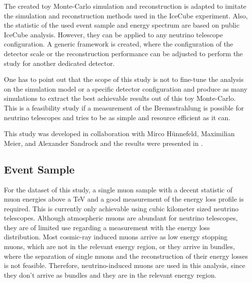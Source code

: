 The created toy Monte-Carlo simulation and reconstruction is adapted to imitate the simulation and reconstruction methods used in the IceCube experiment.
Also, the statistic of the used event sample and energy spectrum are based on public IceCube analysis.
However, they can be applied to any neutrino telescope configuration.
A generic framework is created, where the configuration of the detector scale or the reconstruction performance can be adjusted to perform the study for another dedicated detector.

One has to point out that the scope of this study is not to fine-tune the analysis on the simulation model or a specific detector configuration and produce as many simulations to extract the best achievable results out of this toy Monte-Carlo.
This is a feasibility study if a measurement of the Bremsstrahlung is possible for neutrino telescopes and tries to be as simple and resource efficient as it can.

This study was developed in collaboration with Mirco Hünnefeld, Maximilian Meier, and Alexander Sandrock and the results were presented in \cite{Soedingrekso20ICPPA}.

%

\subsection{Event Sample}

For the dataset of this study, a single muon sample with a decent statistic of muon energies above a TeV and a good measurement of the energy loss profile is required.
This is currently only achievable using cubic kilometer sized neutrino telescopes.
Although atmospheric muons are abundant for neutrino telescopes, they are of limited use regarding a measurement with the energy loss distribution.
Most cosmic-ray induced muons arrive as low energy stopping muons, which are not in the relevant energy region, or they arrive in bundles, where the separation of single muons and the reconstruction of their energy losses is not feasible.
Therefore, neutrino-induced muons are used in this analysis, since they don't arrive as bundles and they are in the relevant energy region.


